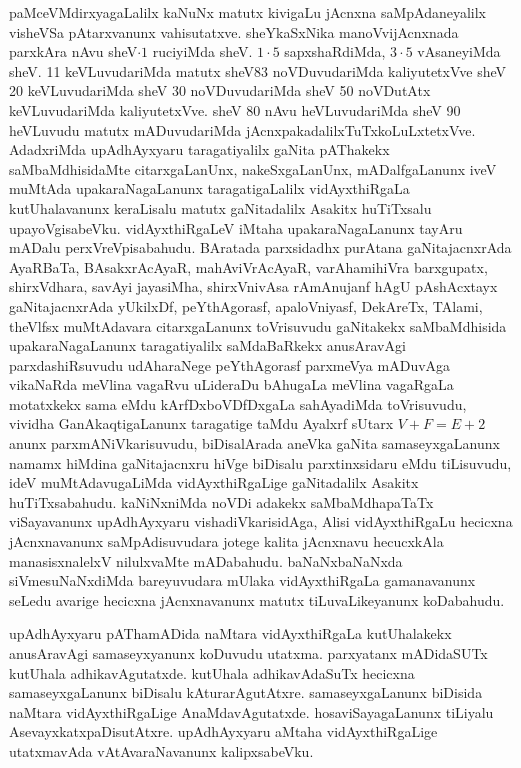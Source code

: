 paMceVMdirxyagaLalilx kaNuNx matutx kivigaLu jAcnxna saMpAdaneyalilx visheVSa pAtarxvanunx vahisutatxve. sheYkaSxNika manoVvijAcnxnada parxkAra nAvu sheV$\cdot 1$ ruciyiMda sheV. 
$1\cdot 5$ sapxshaRdiMda, $3\cdot 5$ vAsaneyiMda sheV. {\rm 11} keVLuvudariMda matutx sheV{\rm 83} noVDuvudariMda kaliyutetxVve sheV {\rm 20} keVLuvudariMda sheV {\rm 30} noVDuvudariMda sheV {\rm 50} noVDutAtx keVLuvudariMda kaliyutetxVve. sheV {\rm 80} nAvu heVLuvudariMda sheV {\rm 90} heVLuvudu matutx mADuvudariMda jAcnxpakadalilxTuTxkoLuLxtetxVve. AdadxriMda upAdhAyxyaru taragatiyalilx gaNita pAThakekx saMbaMdhisidaMte citarxgaLanUnx, nakeSxgaLanUnx, mADalfgaLanunx iveV muMtAda upakaraNagaLanunx taragatigaLalilx vidAyxthiRgaLa kutUhalavanunx keraLisalu matutx gaNitadalilx Asakitx huTiTxsalu upayoVgisabeVku. vidAyxthiRgaLeV iMtaha upakaraNagaLanunx tayAru mADalu perxVreVpisabahudu. BAratada parxsidadhx purAtana gaNitajacnxrAda AyaRBaTa, BAsakxrAcAyaR, mahAviVrAcAyaR, varAhamihiVra barxgupatx, shirxVdhara, savAyi jayasiMha, shirxVnivAsa rAmAnujanf hAgU pAshAcxtayx gaNitajacnxrAda yUkilxDf, peYthAgorasf, apaloVniyasf, DekAreTx, TAlami, theVlfsx muMtAdavara citarxgaLanunx toVrisuvudu gaNitakekx saMbaMdhisida upakaraNagaLanunx taragatiyalilx saMdaBaRkekx anusAravAgi parxdashiRsuvudu udAharaNege peYthAgorasf parxmeVya mADuvAga vikaNaRda meVlina vagaRvu uLideraDu bAhugaLa meVlina vagaRgaLa motatxkekx sama eMdu kArfDxboVDfDxgaLa sahAyadiMda toVrisuvudu, vividha GanAkaqtigaLanunx taragatige taMdu Ayalxrf sUtarx $V+F=E+2$ anunx parxmANiVkarisuvudu, biDisalArada aneVka gaNita samaseyxgaLanunx namamx hiMdina gaNitajacnxru hiVge biDisalu parxtinxsidaru eMdu tiLisuvudu, ideV muMtAdavugaLiMda vidAyxthiRgaLige
gaNitadalilx Asakitx huTiTxsabahudu. kaNiNxniMda noVDi adakekx saMbaMdhapaTaTx viSayavanunx upAdhAyxyaru vishadiVkarisidAga, Alisi vidAyxthiRgaLu hecicxna jAcnxnavanunx saMpAdisuvudara jotege kalita jAcnxnavu hecucxkAla manasisxnalelxV nilulxvaMte mADabahudu. baNaNxbaNaNxda siVmesuNaNxdiMda bareyuvudara mUlaka vidAyxthiRgaLa gamanavanunx seLedu avarige hecicxna jAcnxnavanunx matutx tiLuvaLikeyanunx koDabahudu.

upAdhAyxyaru pAThamADida naMtara vidAyxthiRgaLa kutUhalakekx anusAravAgi samaseyxyanunx koDuvudu utatxma. parxyatanx mADidaSUTx kutUhala adhikavAgutatxde. kutUhala adhikavAdaSuTx hecicxna samaseyxgaLanunx biDisalu kAturarAgutAtxre. samaseyxgaLanunx biDisida naMtara vidAyxthiRgaLige AnaMdavAgutatxde. hosaviSayagaLanunx tiLiyalu AsevayxkatxpaDisutAtxre. upAdhAyxyaru aMtaha vidAyxthiRgaLige utatxmavAda vAtAvaraNavanunx kalipxsabeVku.

